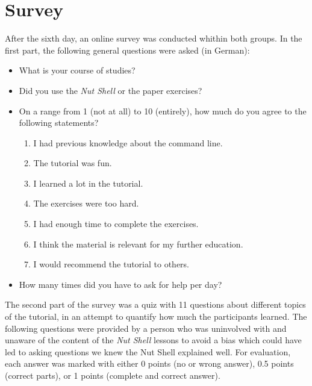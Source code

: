 \documentclass[paper=a4,twoside,abstract=on,cleardoublepage=empty,numbers=noenddot,toc=bib,12pt,appendixprefix=true]{scrreprt}
\begin{document}
\section{Survey}

After the sixth day, an online survey was conducted whithin both groups. In the first part, the following general questions were asked (in German):

\begin{itemize}
    \item What is your course of studies?
    \item Did you use the \emph{Nut Shell} or the paper exercises?
    \item On a range from 1 (not at all) to 10 (entirely), how much do you agree to the following statements?
        \begin{enumerate}
            \item I had previous knowledge about the command line.
            \item The tutorial was fun.
            \item I learned a lot in the tutorial.
            \item The exercises were too hard.
            \item I had enough time to complete the exercises.
            \item I think the material is relevant for my further education.
            \item I would recommend the tutorial to others.
        \end{enumerate}
    \item How many times did you have to ask for help per day?
\end{itemize}

The second part of the survey was a quiz with 11 questions about different topics of the tutorial, in an attempt to quantify how much the participants learned. The following questions were provided by a person who was uninvolved with and unaware of the content of the \emph{Nut Shell} lessons to avoid a bias which could have led to asking questions we knew the Nut Shell explained well. For evaluation, each answer was marked with either 0 points (no or wrong answer), 0.5 points (correct parts), or 1 points (complete and correct answer).
\end{document}
